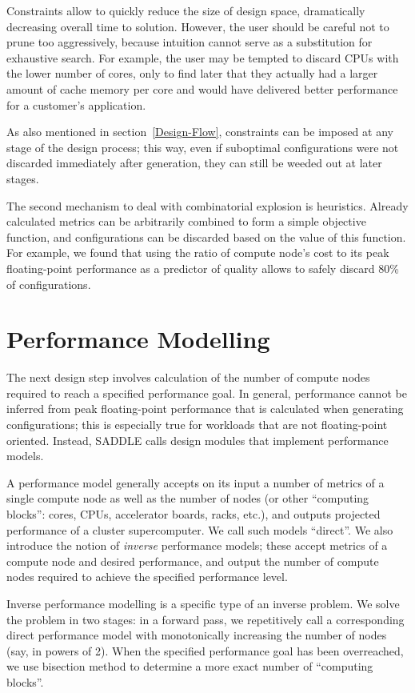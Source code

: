 \documentclass[runningheads,a4paper]{llncs}
\begin{document}
Constraints allow to quickly reduce the size of design space, dramatically decreasing overall time to solution. However, the user should be careful not to prune too aggressively, because intuition cannot serve as a substitution for exhaustive search. For example, the user may be tempted to discard CPUs with the lower number of cores, only to find later that they actually had a larger amount of cache memory per core and would have delivered better performance for a customer's application.

As also mentioned in section~\ref{Design-Flow}, constraints can be imposed at any stage of the design process; this way, even if suboptimal configurations were not discarded immediately after generation, they can still be weeded out at later stages.

The second mechanism to deal with combinatorial explosion is heuristics. Already calculated metrics can be arbitrarily combined to form a simple objective function, and configurations can be discarded based on the value of this function. For example, we found that using the ratio of compute node's cost to its peak floating-point performance as a predictor of quality allows to safely discard 80\% of configurations.


\section{Performance Modelling}

The next design step involves calculation of the number of compute nodes required to reach a specified performance goal. In general, performance cannot be inferred from peak floating-point performance that is calculated when generating configurations; this is especially true for workloads that are not floating-point oriented. Instead, SADDLE calls design modules that implement performance models.

A performance model generally accepts on its input a number of metrics of a single compute node as well as the number of nodes (or other ``computing blocks'': cores, CPUs, accelerator boards, racks, etc.), and outputs projected performance of a cluster supercomputer. We call such models ``direct''. We also introduce the notion of \emph{inverse} performance models; these accept metrics of a compute node and desired performance, and output the number of compute nodes required to achieve the specified performance level.

Inverse performance modelling is a specific type of an inverse problem. We solve the problem in two stages: in a forward pass, we repetitively call a corresponding direct performance model with monotonically increasing the number of nodes (say, in powers of 2). When the specified performance goal has been overreached, we use bisection method to determine a more exact number of ``computing blocks''.
\end{document}
